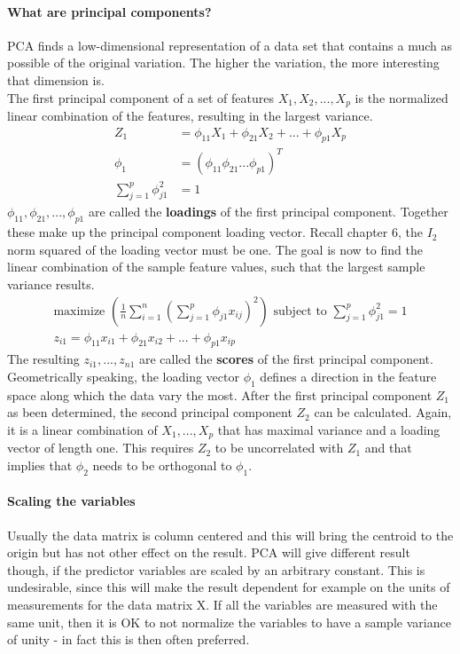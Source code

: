 \documentclass[../document.tex]{subfiles}
\begin{document}
	\paragraph{What are principal components?}
	PCA finds a low-dimensional representation of a data set that contains a much as possible of the original variation. The higher the variation, the more interesting that dimension is.\\
	The first principal component of a set of features \(X_{1},X_{2},...,X_{p}\) is the normalized linear combination of the features, resulting in the largest variance.
	\begin{equation}
	\begin{split}
		Z_{1}&=\phi_{11}X_{1}+\phi_{21}X_{2}+...+\phi_{p1}X_{p}\\
		\phi_{1} &= (\phi_{11} \phi_{21} ... \phi_{p1})^T\\
		\sum_{j=1}^{p}\phi_{j1}^2&=1
	\end{split}
	\end{equation}
	\(\phi_{11}, \phi_{21},...,\phi_{p1}\) are called the \textbf{loadings} of the first principal component. Together these make up the principal component loading vector. Recall chapter 6, the \(I_{2}\) norm squared of the loading vector must be one. The goal is now to find the linear combination of the sample feature values, such that the largest sample variance results.
	\begin{equation}
	\begin{split}
		\text{maximize }(\frac{1}{n}\sum_{i=1}^{n}(\sum_{j=1}^{p}\phi_{j1}x_{ij})^2)\text{ subject to }\sum_{j=1}^{p}\phi_{j1}^2=1\\
		z_{i1}=\phi_{11}x_{i1}+\phi_{21}x_{i2}+...+\phi_{p1}x_{ip}
	\end{split}
	\end{equation}
	The resulting \(z_{i1},...,z_{n1}\) are called the \textbf{scores} of the first principal component. Geometrically speaking, the loading vector \(\phi_{1}\) defines a direction in the feature space along which the data vary the most. After the first principal component \(Z_{1}\) as been determined, the second principal component \(Z_{2}\) can be calculated. Again, it is a linear combination of \(X_{1},...,X_{p}\) that has maximal variance and a loading vector of length one. This requires \(Z_{2}\) to be uncorrelated with \(Z_{1}\) and that implies that \(\phi_{2}\) needs to be orthogonal to \(\phi_{1}\).

	\paragraph{Scaling the variables}
	Usually the data matrix is column centered and this will bring the centroid to the origin but has not other effect on the result. PCA will give different result though, if the predictor variables are scaled by an arbitrary constant. This is undesirable, since this will make the result dependent for example on the units of measurements for the data matrix X. If all the variables are measured with the same unit, then it is OK to not normalize the variables to have a sample variance of unity - in fact this is then often preferred.
\end{document}
